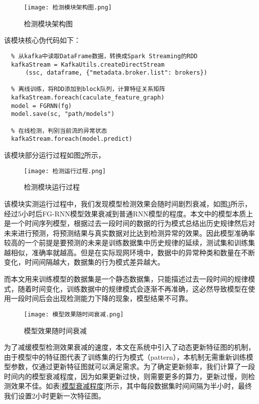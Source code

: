 \begin{figure}
  \centering
  \texttt{[image: 检测模块架构图.png]}
  \caption{检测模块架构图}
  \label{fig:检测模块架构图}
\end{figure}
该模块核心伪代码如下：
\begin{lstlisting}
  % 从kafka中读取DataFrame数据，转换成Spark Streaming的RDD
  kafkaStream = KafkaUtils.createDirectStream
      (ssc, dataframe, {"metadata.broker.list": brokers})

  % 离线训练，将RDD添加到block队列，计算特征关系矩阵
  kafkaStream.foreach(caculate_feature_graph)
  model = FGRNN(fg)
  model.save(sc, "path/models")
  
  % 在线检测，判别当前流的异常状态
  kafkaStream.foreach(model.predict)  
  \end{lstlisting}

该模块部分运行过程如图\ref{fig:检测模块运行过程}所示，

\begin{figure}
  \centering
  \texttt{[image: 检测运行过程.png]}
  \caption{检测模块运行过程}
  \label{fig:检测模块运行过程}
\end{figure}

该模块实测运行过程中，我们发现模型检测效果会随时间剧烈衰减，如图\ref{fig:模型效果随时间衰减}所示，经过5小时后FG-RNN模型效果衰减到普通RNN模型的程度。本文中的模型本质上是一个时间序列模型，根据过去一段时间的数据的行为模式总结出历史规律然后对未来进行预测，将预测结果与真实数据对比达到检测异常的效果。因此模型准确率较高的一个前提是要预测的未来是训练数据集中历史规律的延续，测试集和训练集越相似，准确率就越高。但是在实际现网环境中，数据中的异常种类和数量在不断变化，时间间隔越大，数据集的行为模式差异越大。


而本文用来训练模型的数据集是一个静态数据集，只能描述过去一段时间的规律模式，随着时间变化，训练数据中的规律模式会逐渐不再准确，这必然导致模型在使用一段时间后会出现检测能力下降的现象，模型结果不可靠。

\begin{figure}
  \centering
  \texttt{[image: 模型效果随时间衰减.png]}
  \caption{模型效果随时间衰减}
  \label{fig:模型效果随时间衰减}
\end{figure}

为了减缓模型检测效果衰减的速度，本文在系统中引入了动态更新特征图的机制，由于模型中的特征图代表了训练集的行为模式（pattern），本机制无需重新训练模型参数，仅通过更新特征图就可以满足需求。为了确定更新频率，我们计算了一段时间内的模型衰减程度，因为如果更新过快，则需要更多的算力，更新过慢，则检测效果不佳。如表\ref{模型衰减程度}所示，其中每段数据集时间间隔为半小时，最终我们设置2小时更新一次特征图。

